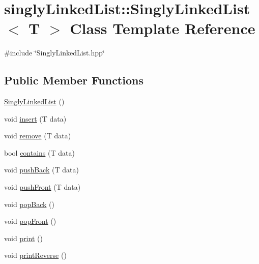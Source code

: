 \hypertarget{classsinglyLinkedList_1_1SinglyLinkedList}{\section{singly\-Linked\-List\-:\-:Singly\-Linked\-List$<$ T $>$ Class Template Reference}
\label{classsinglyLinkedList_1_1SinglyLinkedList}
}


{\ttfamily \#include \char`\"{}Singly\-Linked\-List.\-hpp\char`\"{}}

\subsection*{Public Member Functions}
\begin{DoxyCompactItemize}
\item 
\hyperlink{classsinglyLinkedList_1_1SinglyLinkedList_abef95a5909b8855085926b551d49054c}{Singly\-Linked\-List} ()
\item 
void \hyperlink{classsinglyLinkedList_1_1SinglyLinkedList_a4d024bd7b33ba6cdcb51d12cb7ed7c65}{insert} (T data)
\item 
void \hyperlink{classsinglyLinkedList_1_1SinglyLinkedList_aa47a3eb6b0eb11e167785b633d1a08dc}{remove} (T data)
\item 
bool \hyperlink{classsinglyLinkedList_1_1SinglyLinkedList_ad7bce6e556cbde019715fb573d583248}{contains} (T data)
\item 
void \hyperlink{classsinglyLinkedList_1_1SinglyLinkedList_abf161ed8577dafc6dfcae9b4f0fe7a0d}{push\-Back} (T data)
\item 
void \hyperlink{classsinglyLinkedList_1_1SinglyLinkedList_a3836cea467c1b36ba5840fc3234a50b7}{push\-Front} (T data)
\item 
void \hyperlink{classsinglyLinkedList_1_1SinglyLinkedList_a4bea2402121824773e0279477cb38ade}{pop\-Back} ()
\item 
void \hyperlink{classsinglyLinkedList_1_1SinglyLinkedList_aeefd0393b5683ad9344640e846403333}{pop\-Front} ()
\item 
void \hyperlink{classsinglyLinkedList_1_1SinglyLinkedList_a69edb1ed78876f53d0c6126bfa71bb0d}{print} ()
\item 
void \hyperlink{classsinglyLinkedList_1_1SinglyLinkedList_a99bc7cdfa813ca81b268a8983d9924b8}{print\-Reverse} ()
\end{DoxyCompactItemize}
